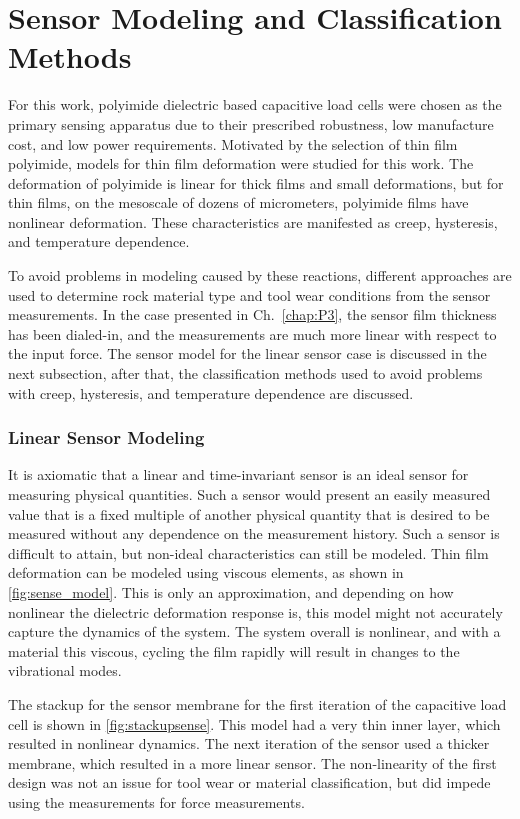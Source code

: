 \chapter{Sensor Modeling and Classification Methods}

For this work, polyimide dielectric based capacitive load cells were chosen as the primary sensing apparatus
due to their prescribed robustness, low manufacture cost, and low power requirements.
Motivated by the selection of thin film polyimide, 
models for thin film deformation were studied for this work.
The deformation of polyimide is linear for thick films
and small deformations, but for thin films, 
on the mesoscale of dozens of micrometers,
polyimide films have nonlinear deformation.
These characteristics are manifested as creep, hysteresis, 
and temperature dependence.

To avoid problems in modeling caused by these reactions,
different approaches are used to determine rock material type and tool wear conditions 
from the sensor measurements. In the case presented in Ch.~\ref{chap:P3}, the sensor
film thickness has been dialed-in, and the measurements are much more linear with respect
to the input force. The sensor model for the linear sensor case is discussed in the next subsection,
after that, the classification methods used to avoid problems with creep, hysteresis, and temperature dependence
are discussed.

\subsection{Linear Sensor Modeling}

It is axiomatic that a linear and time-invariant sensor is an ideal sensor for measuring physical quantities.
Such a sensor would present an easily measured value that is a fixed multiple of another 
physical quantity that is desired to be measured without any dependence on the measurement history.
Such a sensor is difficult to attain, but non-ideal characteristics can still be modeled. 
Thin film deformation can be modeled using viscous elements, as shown in \ref{fig:sense_model}.
This is only an approximation, and depending on how nonlinear the dielectric deformation response is,
this model might not accurately capture the dynamics of the system.
The system overall is nonlinear, and with a material this viscous,
cycling the film rapidly will result in changes to the vibrational modes.

The stackup for the sensor membrane for the first iteration of the capacitive load cell
is shown in \ref{fig:stackupsense}. This model had a very thin inner layer, which resulted
in nonlinear dynamics. The next iteration of the sensor used a thicker membrane,
which resulted in a more linear sensor. 
The non-linearity of the first design was not an issue for tool wear or material classification,
but did impede using the measurements for force measurements. 

